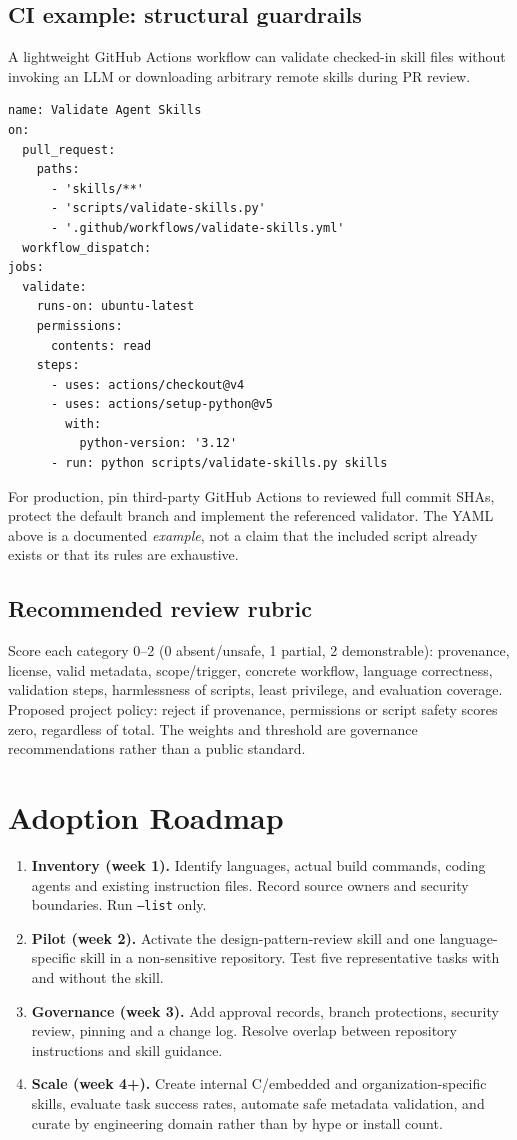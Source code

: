 \documentclass[11pt,letterpaper]{article}
\begin{document}
\subsection{CI example: structural guardrails}
A lightweight GitHub Actions workflow can validate checked-in skill files without invoking an LLM or downloading arbitrary remote skills during PR review.
\begin{lstlisting}[style=yamlstyle]
name: Validate Agent Skills
on:
  pull_request:
    paths:
      - 'skills/**'
      - 'scripts/validate-skills.py'
      - '.github/workflows/validate-skills.yml'
  workflow_dispatch:
jobs:
  validate:
    runs-on: ubuntu-latest
    permissions:
      contents: read
    steps:
      - uses: actions/checkout@v4
      - uses: actions/setup-python@v5
        with:
          python-version: '3.12'
      - run: python scripts/validate-skills.py skills
\end{lstlisting}
For production, pin third-party GitHub Actions to reviewed full commit SHAs, protect the default branch and implement the referenced validator. The YAML above is a documented \emph{example}, not a claim that the included script already exists or that its rules are exhaustive.

\subsection{Recommended review rubric}
Score each category 0--2 (0 absent/unsafe, 1 partial, 2 demonstrable): provenance, license, valid metadata, scope/trigger, concrete workflow, language correctness, validation steps, harmlessness of scripts, least privilege, and evaluation coverage. Proposed project policy: reject if provenance, permissions or script safety scores zero, regardless of total. The weights and threshold are governance recommendations rather than a public standard.

\section{Adoption Roadmap}
\begin{enumerate}[label=\textbf{Phase \arabic*:}]
\item \textbf{Inventory (week 1).} Identify languages, actual build commands, coding agents and existing instruction files. Record source owners and security boundaries. Run \texttt{--list} only.
\item \textbf{Pilot (week 2).} Activate the design-pattern-review skill and one language-specific skill in a non-sensitive repository. Test five representative tasks with and without the skill.
\item \textbf{Governance (week 3).} Add approval records, branch protections, security review, pinning and a change log. Resolve overlap between repository instructions and skill guidance.
\item \textbf{Scale (week 4+).} Create internal C/embedded and organization-specific skills, evaluate task success rates, automate safe metadata validation, and curate by engineering domain rather than by hype or install count.
\end{enumerate}
\end{document}

